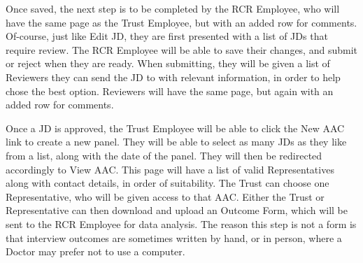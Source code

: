 Once saved, the next step is to be completed by the RCR Employee, who will have the same page as the Trust Employee, but with an added row for comments. Of-course, just like Edit JD, they are first presented with a list of JDs that require review. The RCR Employee will be able to save their changes, and submit or reject when they are ready. When submitting, they will be given a list of Reviewers they can send the JD to with relevant information, in order to help chose the best option. Reviewers will have the same page, but again with an added row for comments. 

Once a JD is approved, the Trust Employee will be able to click the New AAC link to create a new panel. They will be able to select as many JDs as they like from a list, along with the date of the panel. They will then be redirected accordingly to View AAC. This page will have a list of valid Representatives along with contact details, in order of suitability. The Trust can choose one Representative, who will be given access to that AAC. Either the Trust or Representative can then download and upload an Outcome Form, which will be sent to the RCR Employee for data analysis. The reason this step is not a form is that interview outcomes are sometimes written by hand, or in person, where a Doctor may prefer not to use a computer.
